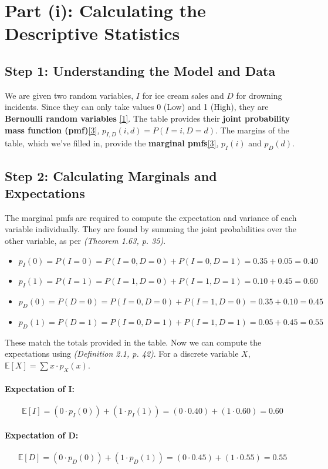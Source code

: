 \documentclass[11pt,a4paper]{article}
\newcommand{\scriptcite}[2]{\textit{(#1, p. #2)}}
\newcommand{\E}{\mathbb{E}}
\begin{document}
\section{Part (i): Calculating the Descriptive Statistics}

\subsection{Step 1: Understanding the Model and Data}
We are given two random variables, $I$ for ice cream sales and $D$ for drowning incidents. Since they can only take values 0 (Low) and 1 (High), they are \textbf{Bernoulli random variables} \hyperlink{note1}{[1]}. The table provides their \textbf{joint probability mass function (pmf)}\hyperlink{note3}{[3]}, $p_{I,D}(i,d) = P(I=i, D=d)$. The margins of the table, which we've filled in, provide the \textbf{marginal pmfs}\hyperlink{note3}{[3]}, $p_I(i)$ and $p_D(d)$.

\subsection{Step 2: Calculating Marginals and Expectations}
The marginal pmfs are required to compute the expectation and variance of each variable individually. They are found by summing the joint probabilities over the other variable, as per \scriptcite{Theorem 1.63}{35}.
\begin{itemize}
    \item $p_I(0) = P(I=0) = P(I=0, D=0) + P(I=0, D=1) = 0.35 + 0.05 = 0.40$
    \item $p_I(1) = P(I=1) = P(I=1, D=0) + P(I=1, D=1) = 0.10 + 0.45 = 0.60$
    \item $p_D(0) = P(D=0) = P(I=0, D=0) + P(I=1, D=0) = 0.35 + 0.10 = 0.45$
    \item $p_D(1) = P(D=1) = P(I=0, D=1) + P(I=1, D=1) = 0.05 + 0.45 = 0.55$
\end{itemize}
These match the totals provided in the table. Now we can compute the expectations using \scriptcite{Definition 2.1}{42}. For a discrete variable $X$, $\E[X] = \sum x \cdot p_X(x)$.

\paragraph{Expectation of I:}
\[ \E[I] = (0 \cdot p_I(0)) + (1 \cdot p_I(1)) = (0 \cdot 0.40) + (1 \cdot 0.60) = \mathbf{0.60} \]

\paragraph{Expectation of D:}
\[ \E[D] = (0 \cdot p_D(0)) + (1 \cdot p_D(1)) = (0 \cdot 0.45) + (1 \cdot 0.55) = \mathbf{0.55} \]
\end{document}
